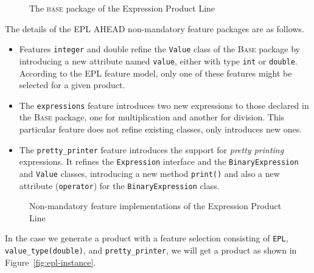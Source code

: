 \begin{figure}[htb]
    \label{fig:epl-base}
    \caption{The \textsc{base} package of the Expression Product Line}
\end{figure} 

The details of the EPL AHEAD non-mandatory feature packages are as follows. 

\begin{itemize}
    \item Features \texttt{integer} and {double} refine the \texttt{Value} class of 
    the \textsc{Base} package by introducing a new attribute named 
    \texttt{value}, either with type \texttt{int} or \texttt{double}. According 
    to the EPL feature model, only one of these features might be selected for 
    a given product. 

    \item The \texttt{expressions} feature introduces two new expressions 
    to those declared in the \textsc{Base} package, one for multiplication 
    and another for division. This particular feature does not refine 
    existing classes, only introduces new ones. 

    \item The \texttt{pretty\_printer} feature introduces the support for 
    \emph{pretty printing} expressions. It refines the \texttt{Expression} 
    interface and the \texttt{BinaryExpression} and \texttt{Value} classes, 
    introducing a new method \texttt{print()} and also a 
    new attribute (\texttt{operator}) for the \texttt{BinaryExpression} class.
\end{itemize}


\begin{figure}[htb]
\label{fig:epl-features}
\caption{Non-mandatory feature implementations of the Expression Product Line}
\end{figure} 

In the case we generate a product with  
a feature selection consisting of 
\texttt{EPL}, \texttt{value\_type(double)}, 
and \texttt{pretty\_printer}, we will get 
a product as shown in Figure~\ref{fig:epl-instance}. 
